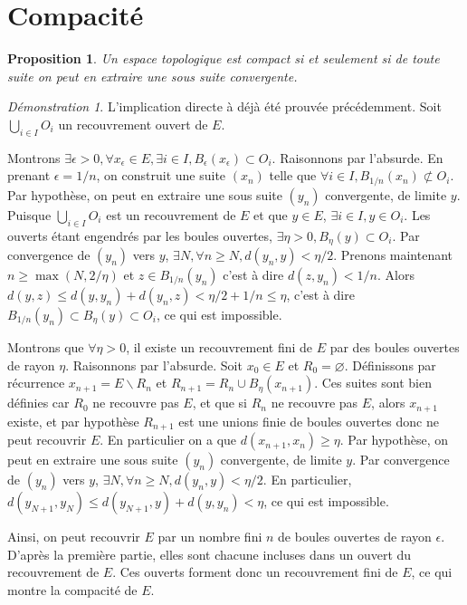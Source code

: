 \documentclass[a4paper, 11pt, french]{book}
\theoremstyle{plain} %
\newtheorem{proposition}{Proposition}
\theoremstyle{definition} %
\theoremstyle{remark} %
\newtheorem*{demonstration}{Démonstration}
\renewcommand{\setminus}{\backslash}
\newcommand{\1}{\mathds{1}}
\newcommand\vide{\varnothing}
\newcommand{\infegal}{\leqslant}
\newcommand{\supegal}{\geqslant}
\begin{document}
\section{Compacité}

\begin{proposition}
	Un espace topologique est compact si et seulement si de toute suite on peut en extraire une sous suite convergente.
\end{proposition}

\begin{demonstration}
	L'implication directe à déjà été prouvée précédemment.
	Soit $\bigcup_{i\in I}O_i$ un recouvrement ouvert de $E$.

	Montrons $\exists\epsilon>0, \forall x_\epsilon\in E, \exists i\in I, B_\epsilon(x_\epsilon)\subset O_i$.
	Raisonnons par l'absurde.
	En prenant $\epsilon=1/n$, on construit une suite $(x_n)$ telle que $\forall i\in I, B_{1/n}(x_n)\not\subset O_i$.
	Par hypothèse, on peut en extraire une sous suite $(y_n)$ convergente, de limite $y$.
	Puisque $\bigcup_{i\in I}O_i$ est un recouvrement de $E$ et que $y\in E$, $\exists i\in I, y\in O_i$.
	Les ouverts étant engendrés par les boules ouvertes, $\exists\eta>0, B_\eta(y)\subset O_i$.
	Par convergence de $(y_n)$ vers $y$, $\exists N, \forall n\supegal N, d(y_n, y)<\eta/2$.
	Prenons maintenant $n\supegal\max(N, 2/\eta)$ et $z\in B_{1/n}(y_n)$ c'est à dire $d(z, y_n)<1/n$.
	Alors $d(y, z)\infegal d(y, y_n)+d(y_n, z)<\eta/2+1/n\infegal\eta$, c'est à dire $B_{1/n}(y_n)\subset B_\eta(y)\subset O_i$, ce qui est impossible.

	Montrons que $\forall\eta>0$, il existe un recouvrement fini de $E$ par des boules ouvertes de rayon $\eta$.
	Raisonnons par l'absurde.
	Soit $x_0\in E$ et $R_0=\vide$.
	Définissons par récurrence $x_{n+1}=E\setminus R_n$ et $R_{n+1}=R_n\cup B_\eta(x_{n+1})$.
	Ces suites sont bien définies car $R_0$ ne recouvre pas $E$, et que si $R_n$ ne recouvre pas $E$, alors $x_{n+1}$ existe, et par hypothèse $R_{n+1}$ est une unions finie de boules ouvertes donc ne peut recouvrir $E$.
	En particulier on a que $d(x_{n+1}, x_n)\supegal\eta$.
	Par hypothèse, on peut en extraire une sous suite $(y_n)$ convergente, de limite $y$.
	Par convergence de $(y_n)$ vers $y$, $\exists N, \forall n\supegal N, d(y_n, y)<\eta/2$.
	En particulier, $d(y_{N+1}, y_N)\infegal d(y_{N+1}, y)+d(y, y_n)<\eta$, ce qui est impossible.

	Ainsi, on peut recouvrir $E$ par un nombre fini $n$ de boules ouvertes de rayon $\epsilon$.
	D'après la première partie, elles sont chacune incluses dans un ouvert du recouvrement de $E$.
	Ces ouverts forment donc un recouvrement fini de $E$, ce qui montre la compacité de $E$.
\end{demonstration}
\end{document}
